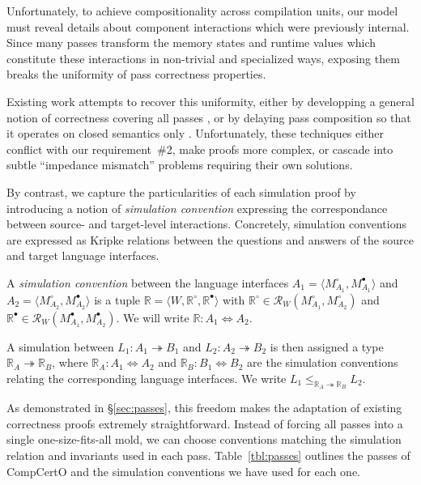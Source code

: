 \documentclass[acmsmall,authordraft]{acmart}
\newcommand{\que}{\circ}
\newcommand{\ans}{\bullet}
\begin{document}
Unfortunately,
to achieve compositionality across compilation units,
our model must reveal details
about component interactions
which were previously internal.
Since many passes transform the
memory states and runtime values
which constitute these interactions
in non-trivial and specialized ways,
exposing them breaks the uniformity
of pass correctness properties.

Existing work attempts to recover this uniformity,
either by developping a general notion of correctness
covering all passes
\cite{compcompcert,compcertm},
or by delaying pass composition so that
it operates on closed semantics only
\cite{sepcompcert,compcertm}.
Unfortunately, these techniques either
conflict with our requirement~\#2,
make proofs more complex,
or cascade into subtle ``impedance mismatch'' problems
requiring their own solutions.

By contrast,
we capture the particularities of each simulation proof
by introducing a notion of \emph{simulation convention}
expressing the correspondance between
source- and target-level interactions.
Concretely,
simulation conventions are expressed as Kripke relations
between the questions and answers of
the source and target language interfaces.

\begin{definition} \label{def:simconv} %
A \emph{simulation convention} between the language interfaces
$A_1 = \langle M_{A_1}^\que, M_{A_1}^\ans \rangle$ and
$A_2 = \langle M_{A_2}^\que, M_{A_2}^\ans \rangle$
is a tuple $\mathbb{R} = \langle W, \mathbb{R}^\que, \mathbb{R}^\ans \rangle$
with $\mathbb{R}^\que \in \mathcal{R}_W(M_{A_1}^\que, M_{A_2}^\que)$
and $\mathbb{R}^\ans \in \mathcal{R}_W(M_{A_1}^\ans, M_{A_2}^\ans)$.
We will write $\mathbb{R} : A_1 \Leftrightarrow A_2$.
\end{definition}

A simulation between %
$L_1 : A_1 \twoheadrightarrow B_1$ and
$L_2 : A_2 \twoheadrightarrow B_2$
is then assigned a type $\mathbb{R}_A \twoheadrightarrow \mathbb{R}_B$,
where %
$\mathbb{R}_A : A_1 \Leftrightarrow A_2$ and
$\mathbb{R}_B : B_1 \Leftrightarrow B_2$
are the simulation conventions
relating the corresponding language interfaces.
We write
$L_1 \le_{\mathbb{R}_A \twoheadrightarrow \mathbb{R}_B} L_2$.

As demonstrated in \S\ref{sec:passes}, this freedom
makes the adaptation of existing correctness proofs
extremely straightforward.
Instead of forcing all passes into a single one-size-fits-all mold,
we can choose conventions matching
the simulation relation and invariants
used in each pass.
Table~\ref{tbl:passes} outlines the passes of CompCertO
and the simulation conventions
we have used for each one.
\end{document}
